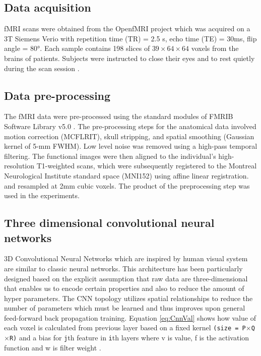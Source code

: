 \documentclass[a4paper,fleqn]{cas-dc}
\begin{document}
\subsection{Data acquisition}
\label{section:data}
fMRI scans were obtained from the OpenfMRI project which was acquired on a 3T Siemens Verio with repetition time (TR) = 2.5 s, echo time (TE) = 30ms, flip angle = 80°. Each sample contains 198 slices of $39 \times 64 \times 64$ voxels from the brains of patients. Subjects were instructed to close their eyes and to rest quietly during the scan session \cite{OpenFmri}.

\subsection{Data pre-processing}
\label{section:preprocessing}
The fMRI data were pre-processed using the standard modules of FMRIB Software Library v5.0 \cite{FMRIB}. The pre-processing steps for the anatomical data involved motion correction (MCFLRIT), skull stripping, and spatial smoothing (Gaussian kernel of 5-mm FWHM). Low level noise was removed using a high-pass temporal filtering. The functional images were then aligned to the individual's high-resolution T1-weighted scans, which were subsequently registered to the Montreal Neurological Institute standard space (MNI152) using affine linear registration. and resampled at 2mm cubic voxels. The product of the preprocessing step was used in the experiments.



\subsection{Three dimensional convolutional neural networks}
\label{section:3dCnn}
3D Convolutional Neural Networks which are inspired by human visual system are similar to classic neural networks. This architecture has been particularly designed based on the explicit assumption that raw data are three-dimensional that enables us to encode certain properties and also to reduce the amount of hyper parameters. The CNN topology utilizes spatial relationships to reduce the number of parameters which must be learned and thus improves upon general feed-forward back propagation training. Equation \eqref{eq:CnnVal} shows how value of each voxel is calculated from previous layer based on a fixed kernel \texttt{(size = P$\times$Q$\times$R)} and a bias for \texttt{j}th feature in \texttt{i}th layers where v is value, f is the activation function and w is filter weight \cite{Ji2013}.
\end{document}
